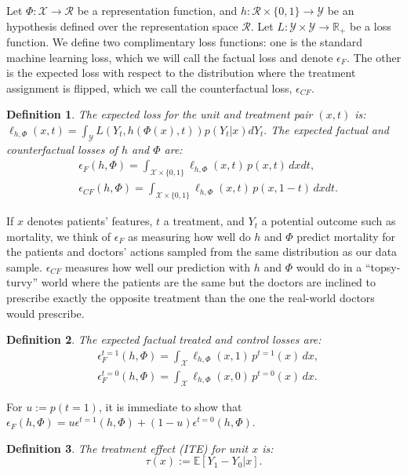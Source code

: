 \documentclass{article}
\newtheorem{thmdef}{Definition}
\def\E{\mathbb{E}}
\def\cX{\mathcal X}
\def\cY{\mathcal Y}
\def\cR{\mathcal{R}}
\def \R{\mathbb{R}}
\newcommand{\pc}{p^{t=0}}
\newcommand{\pt}{p^{t=1}}
\newcommand{\lyth}{\ell_{h,\Phi}(x,t)}
\newcommand{\lyxzeroh}{\ell_{h,\Phi}(x,0)}
\newcommand{\lyxoneh}{\ell_{h,\Phi}(x,1)}
\begin{document}
Let $\Phi : \cX \rightarrow \cR$ be a representation function, and $h :\cR \times \{0,1\} \rightarrow \cY$ be an hypothesis defined over the representation space $\cR$. Let $L: \cY \times \cY \rightarrow \R_+$ be a loss function. We define two complimentary loss functions: one is the standard machine learning loss, which we will call the factual loss and denote $\epsilon_F$. The other is the expected loss with respect to the distribution where the treatment assignment is flipped, which we call the counterfactual loss, $\epsilon_{CF}$.


\begin{thmdef}\label{def:perunitloss}
The expected loss for the unit and treatment pair $(x,t)$ is:
$\ell_{h,\Phi}(x,t) = \int_\cY L(Y_t,h(\Phi(x),t)) p(Y_t|x) dY_t.$
The expected factual and counterfactual losses of $h$ and $\Phi$ are:
\begin{align*}
&\epsilon_F(h,\Phi) = \int_{\cX \times \{0,1\}} \!\!\!\!\!\!\! \lyth\, p(x,t)\, dxdt, \\
&\epsilon_{CF}(h,\Phi) = \int_{\cX \times \{0,1\}} \!\!\!\!\!\!\! \lyth\, p(x,1-t)\, dxdt .
\end{align*}
\end{thmdef}

If $x$ denotes patients' features, $t$ a treatment, and $Y_t$ a potential outcome such as mortality, we think of $\epsilon_F$ as measuring how well do $h$ and $\Phi$ predict mortality for the patients and doctors' actions sampled from the same distribution as our data sample. $\epsilon_{CF}$ measures how well our prediction with $h$ and $\Phi$ would do in a ``topsy-turvy'' world where the patients are the same but the doctors are inclined to prescribe exactly the opposite treatment than the one the real-world doctors would prescribe.

\begin{thmdef}\label{def:decompef}
The expected factual \emph{treated} and \emph{control} losses are:
\begin{align*}
&\epsilon^{t=1}_F(h,\Phi) = \int_{\cX } \!\!\! \lyxoneh\, \pt(x)\, dx ,\\
&\epsilon^{t=0}_F(h,\Phi) = \int_{\cX } \!\!\! \lyxzeroh\, \pc(x)\, dx .
\end{align*}
\end{thmdef}
For $u:=p(t=1)$, it is immediate to show that $\epsilon_F(h,\Phi) = u \epsilon^{t=1}(h,\Phi) + (1-u) \epsilon^{t=0}(h,\Phi)$.


\begin{thmdef}\label{def:te}
The treatment effect (ITE) for unit $x$ is:
$$\tau(x) := \E\left[Y_1 - Y_0 | x \right].$$
\end{thmdef}
\end{document}
